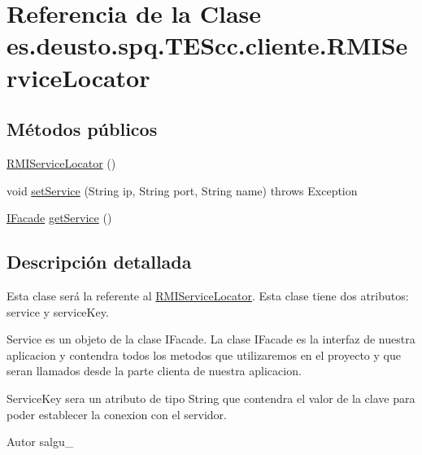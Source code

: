 \hypertarget{classes_1_1deusto_1_1spq_1_1_t_e_scc_1_1cliente_1_1_r_m_i_service_locator}{\section{Referencia de la Clase es.\+deusto.\+spq.\+T\+E\+Scc.\+cliente.\+R\+M\+I\+Service\+Locator}
\label{classes_1_1deusto_1_1spq_1_1_t_e_scc_1_1cliente_1_1_r_m_i_service_locator}
}
\subsection*{Métodos públicos}
\begin{DoxyCompactItemize}
\item 
\hyperlink{classes_1_1deusto_1_1spq_1_1_t_e_scc_1_1cliente_1_1_r_m_i_service_locator_a73c9f337fadad992f291e272b412843c}{R\+M\+I\+Service\+Locator} ()
\item 
void \hyperlink{classes_1_1deusto_1_1spq_1_1_t_e_scc_1_1cliente_1_1_r_m_i_service_locator_a3eae674f78d8e238f3eb0db65901066d}{set\+Service} (String ip, String port, String name)  throws Exception 
\item 
\hyperlink{interfacees_1_1deusto_1_1spq_1_1_t_e_scc_1_1servidor_1_1_i_facade}{I\+Facade} \hyperlink{classes_1_1deusto_1_1spq_1_1_t_e_scc_1_1cliente_1_1_r_m_i_service_locator_a4a8aa79d8abedd6b298977e6ac9a6114}{get\+Service} ()
\end{DoxyCompactItemize}


\subsection{Descripción detallada}
Esta clase será la referente al \hyperlink{classes_1_1deusto_1_1spq_1_1_t_e_scc_1_1cliente_1_1_r_m_i_service_locator}{R\+M\+I\+Service\+Locator}. Esta clase tiene dos atributos\+: service y service\+Key.
\begin{DoxyEnumerate}
\item Service es un objeto de la clase I\+Facade. La clase I\+Facade es la interfaz de nuestra aplicacion y contendra todos los metodos que utilizaremos en el proyecto y que seran llamados desde la parte clienta de nuestra aplicacion.
\item Service\+Key sera un atributo de tipo String que contendra el valor de la clave para poder establecer la conexion con el servidor. \begin{DoxyAuthor}{Autor}
salgu\+\_ 
\end{DoxyAuthor}

\end{DoxyEnumerate}

